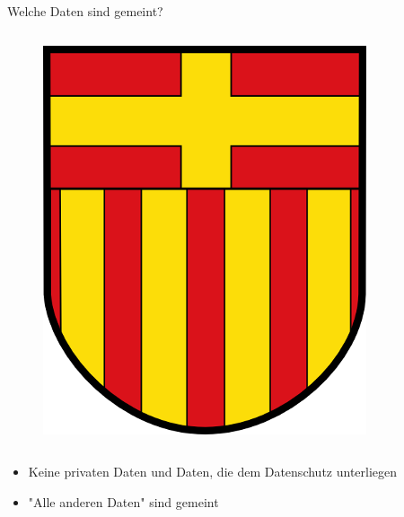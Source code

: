 \begin{frame}[t]{Welche Daten sind gemeint?}
\begin{columns}
  \begin{figure}[h]
   \centering
   \includegraphics[scale=0.3]{section_open_data_flag_paderborn.png}
  \end{figure}
 \end{columns}
 
 \begin{block}{}
 \begin{itemize}
  \item Keine privaten Daten und Daten, die dem Datenschutz unterliegen
  \item "Alle anderen Daten" sind gemeint
 \end{itemize}
 \end{block}
\end{frame}

